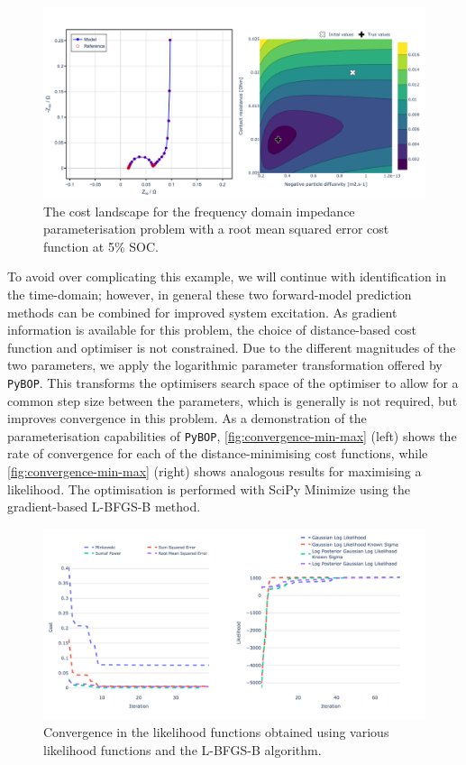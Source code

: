 \documentclass[
]{article}
\begin{document}
\begin{figure}
\centering
\includegraphics[width=1\textwidth,height=\textheight]{figures/joss/impedance.png}
\caption{The cost landscape for the frequency domain impedance
parameterisation problem with a root mean squared error cost function at
5\% SOC. \label{fig:impedance-landscape}}
\end{figure}

To avoid over complicating this example, we will continue with
identification in the time-domain; however, in general these two
forward-model prediction methods can be combined for improved system
excitation. As gradient information is available for this problem, the
choice of distance-based cost function and optimiser is not constrained.
Due to the different magnitudes of the two parameters, we apply the
logarithmic parameter transformation offered by \texttt{PyBOP}. This
transforms the optimisers search space of the optimiser to allow for a
common step size between the parameters, which is generally is not
required, but improves convergence in this problem. As a demonstration
of the parameterisation capabilities of \texttt{PyBOP},
\autoref{fig:convergence-min-max} (left) shows the rate of convergence
for each of the distance-minimising cost functions, while
\autoref{fig:convergence-min-max} (right) shows analogous results for
maximising a likelihood. The optimisation is performed with SciPy
Minimize using the gradient-based L-BFGS-B method.

\begin{figure}
\centering
\includegraphics[width=1\textwidth,height=\textheight]{figures/joss/converge.png}
\caption{Convergence in the likelihood functions obtained using various
likelihood functions and the L-BFGS-B algorithm.
\label{fig:convergence-min-max}}
\end{figure}
\end{document}
